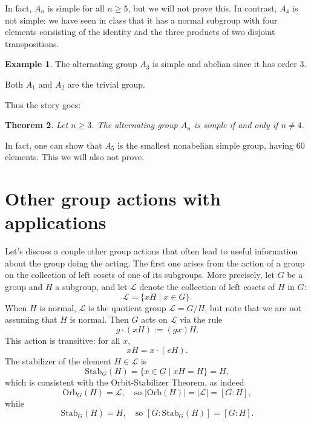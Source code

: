\documentclass[12pt]{report}
\newtheorem{theorem}{Theorem}[chapter]
\numberwithin{equation}{section}
\numberwithin{theorem}{chapter}
\theoremstyle{definition}
\newtheorem{example}[theorem]{Example}
\newtheorem*{basic properties}{Basic Properties}
\newtheorem*{Important Remark}{Important Remark}
\begin{document}
In fact, $A_n$ is simple for all $n \geqslant 5$, but we will not prove this. In contrast, $A_4$ is not simple: we have seen in class that it has a normal subgroup with four elements consisting of the identity and the three products of two disjoint transpositions.



\begin{example}
	The alternating group $A_3$ is simple and abelian since it has order $3$. 
\end{example}

Both $A_1$ and $A_2$ are the trivial group. 



 
 Thus the story goes:

\begin{theorem}
	Let $n \geqslant 3$. The alternating group $A_n$ is simple if and only if $n \neq 4$.
\end{theorem}



In fact, one can show that $A_5$ is the smallest nonabelian simple group, having $60$ elements. This we will also not prove.






\section{Other group actions with applications}

Let's discuss a couple other group actions that often lead to useful information about the group doing the acting.
The first one arises from the action of a group on the collection of left cosets of one of its subgroups.
More precisely, let $G$ be a group and $H$ a subgroup, and let $\mathcal{L}$ denote the collection of left cosets of $H$ in $G$: 
$$\mathcal{L} = \{xH \mid x \in G\}.$$ 
When $H$ is normal, $\mathcal{L}$ is the quotient group $\mathcal{L} = G/H$, but note that we are not assuming that $H$ is normal. Then $G$ acts on $\mathcal{L}$ via the rule
$$g \cdot (xH) := (gx)H.$$
This action is transitive: for all $x$, 
$$xH = x \cdot (eH).$$ 
The stabilizer of the element $H \in \mathcal{L}$ is
$$\mathrm{Stab}_G(H) = \{x \in G \mid xH = H\} = H,$$
which is consistent with the Orbit-Stabilizer Theorem, as indeed 
$$\mathrm{Orb}_G(H) = \mathcal{L}, \quad \textrm{so } |\mathrm{Orb}(H)| = |\mathcal{L}| = [G : H],$$
while
$$\mathrm{Stab}_G(H) = H, \quad \textrm{so } [G: \mathrm{Stab}_G(H)] = [G : H].$$
\end{document}
